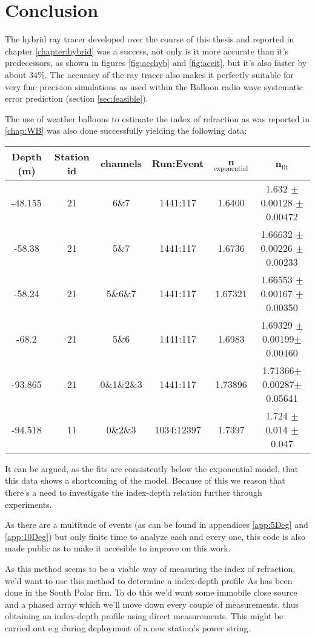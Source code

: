 \chapter*{Conclusion}
The hybrid ray tracer developed over the course of this thesis and reported in
chapter \ref{chapter:hybrid} was a success, not only is it more accurate than
it's predecessors, as shown in figures \ref{fig:acchyb} and \ref{fig:accit},
 but it's also faster by about 34\%.  The accuracy of the ray tracer also
makes it perfectly suitable for very fine precision simulations as used within
the Balloon radio wave systematic error prediction (section \ref{sec:feasible}).

The use of weather balloons to estimate the index of refraction as
was reported in \ref{chap:WB} was also done successfully 
yielding the following data:
\begin{center}
\begin{tabular}{||c c c c c c||}
 \hline
 Depth (m) & Station id & channels & Run:Event & n$_\text{exponential}$ & n$_\text{fit}$\\ [0.5ex]
 \hline\hline
 -48.155 & 21 & 6\&7 & 1441:117 & 1.6400 & 1.632 $\pm$ 0.00128 $\pm$ 0.00472\\
 -58.38 & 21 & 5\&7 & 1441:117 & 1.6736 & 1.66632 $\pm$ 0.00226 $\pm$ 0.00233 \\
 -58.24 & 21 & 5\&6\&7 & 1441:117 & 1.67321 & 1.66553 $\pm$ 0.00167 $\pm$ 0.00350 \\
 -68.2 & 21 & 5\&6 & 1441:117 & 1.6983 & 1.69329 $\pm$0.00199$\pm$0.00460 \\
 -93.865 & 21 & 0\&1\&2\&3 & 1441:117 & 1.73896 & 1.71366$\pm$0.00287$\pm$0.05641\\
 -94.518 & 11 & 0\&2\&3 & 1034:12397 & 1.7397 & 1.724 $\pm$ 0.014 $\pm$ 0.047 \\
 \hline
\end{tabular}
\end{center}
It can be argued, as the fits are consistently below the exponential model,
that this data shows a shortcoming of the model.  Because of this we reason
that there's a need to investigate the index-depth relation further through 
experiments.

As there are a multitude of events (as can be found in appendices
\ref{app:5Deg} and \ref{app:10Deg}) but only finite time to analyze each and
every one, this code is also made public \cite{projects-mt} as to make
it accesible to improve on this work.  

As this method seems to be a viable way of measuring the index of refraction,
we'd want to use this method to determine a index-depth profile
As has been done in the South Polar firn\cite{kravchenko_besson_meyers_2004}.
To do this we'd want some immobile close source and a phased array which we'll
move down every couple of measurements. thus obtaining an index-depth profile
using direct measurements. This might be carried out e.g during deployment
of a new station's power string.
